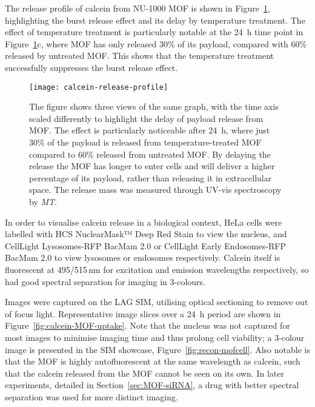The release profile of calcein from NU-1000 MOF is shown in Figure~\ref{fig:calcein-release-profile}, highlighting the burst release effect and its delay by temperature treatment. 
The effect of temperature treatment is particularly notable at the \SI{24}{\hour} time point in Figure~\ref{fig:calcein-release-profile}c, where MOF has only released 30\% of its payload, compared with 60\% released by untreated MOF.
This shows that the temperature treatment successfully suppresses the burst release effect. 
 
\begin{figure}[htbp!]
\centering
\texttt{[image: calcein-release-profile]}
\caption[MOFs: Payload release is delayed by temperature treatment]{ The figure shows three views of the same graph, with the time axis scaled differently to highlight the delay of payload release from MOF. The effect is particularly noticeable after \SI{24}{\hour}, where just 30\% of the payload is released from temperature-treated MOF compared to 60\% released from untreated MOF. By delaying the release the MOF has longer to enter cells and will deliver a higher percentage of its payload, rather than releasing it in extracellular space. The release mass was measured through UV-vis spectroscopy by \textit{MT}. }
\label{fig:calcein-release-profile}
\end{figure}

In order to visualise calcein release in a biological context, HeLa cells were labelled with HCS NuclearMask™ Deep Red Stain to view the nucleus, and CellLight Lysosomes-RFP BacMam 2.0 or CellLight Early Endosomes-RFP BacMam 2.0 to view lysosomes or endosomes respectively. 
Calcein itself is fluorescent at 495/515\,\si{\nano\meter} for excitation and emission wavelengths respectively, so had good spectral separation for imaging in 3-colours. %

Images were captured on the LAG SIM, utilising optical sectioning to remove out of focus light. 
Representative image slices over a \SI{24}{\hour} period are shown in Figure~\ref{fig:calcein-MOF-uptake}. 
Note that the nucleus was not captured for most images to minimise imaging time and thus prolong cell viability; a 3-colour image is presented in the SIM showcase, Figure~\ref{fig:recon-mofcell}. 
Also notable is that the MOF is highly autofluorescent at the same wavelength as calcein, such that the calcein released from the MOF cannot be seen on its own. 
In later experiments, detailed in Section~\ref{sec:MOF-siRNA}, a drug with better spectral separation was used for more distinct imaging.

